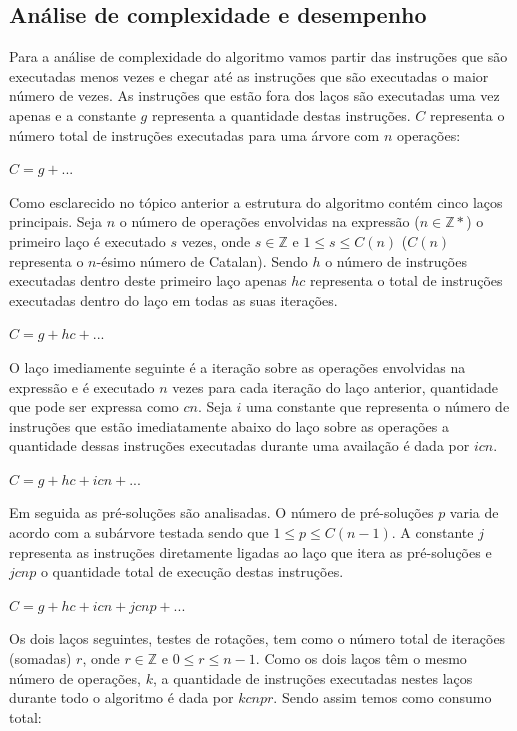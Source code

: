
\subsection{Análise de complexidade e desempenho}
Para a análise de complexidade do algoritmo vamos partir das instruções que são executadas menos vezes e chegar até as instruções que são executadas o maior número de vezes. As instruções que estão fora dos laços são executadas uma vez apenas e a constante $g$ representa a quantidade destas instruções. $C$ representa o número total de instruções executadas para uma árvore com $n$ operações:

$C = g + ...$

Como esclarecido no tópico anterior a estrutura do algoritmo contém cinco laços principais. Seja $n$ o número de operações envolvidas na expressão ($n \in \mathbb{Z}*$) o primeiro laço é executado $s$ vezes, onde $s \in \mathbb{Z}$ e $1 \leqslant s \leqslant C(n)$ ($C(n)$ representa o $n$-ésimo número de Catalan). Sendo $h$ o número de instruções executadas dentro deste primeiro laço apenas $hc$ representa o total de instruções executadas dentro do laço em todas as suas iterações.

$C = g + hc + ...$

O laço imediamente seguinte é a iteração sobre as operações envolvidas na expressão e é executado $n$ vezes para cada iteração do laço anterior, quantidade que pode ser expressa como $cn$. Seja $i$ uma constante que representa o número de instruções que estão imediatamente abaixo do laço sobre as operações a quantidade dessas instruções executadas durante uma availação é dada por $icn$.

$C = g + hc + icn + ...$

Em seguida as pré-soluções são analisadas. O número de pré-soluções $p$ varia de acordo com a subárvore testada sendo que $1 \leqslant p \leqslant C(n-1)$. A constante $j$ representa as instruções diretamente ligadas ao laço que itera as pré-soluções e $jcnp$ o quantidade total de execução destas instruções.

$C = g + hc + icn + jcnp + ...$

Os dois laços seguintes, testes de rotações, tem como o número total de iterações (somadas) $r$, onde $r \in \mathbb{Z}$ e $0 \leqslant r \leqslant n-1$. Como os dois laços têm o mesmo número de operações, $k$, a quantidade de instruções executadas nestes laços durante todo o algoritmo é dada por $kcnpr$. Sendo assim temos como consumo total:

